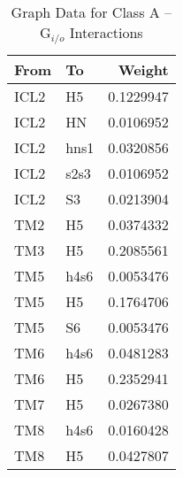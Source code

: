 \begin{table}[!h]

\caption{\label{tab:unnamed-chunk-2}Graph Data for Class A – G$_{i/o}$ Interactions}
\centering
\begin{tabular}{llr}
\toprule
From & To & Weight\\
\midrule
ICL2 & H5 & 0.1229947\\
ICL2 & HN & 0.0106952\\
ICL2 & hns1 & 0.0320856\\
ICL2 & s2s3 & 0.0106952\\
ICL2 & S3 & 0.0213904\\
\addlinespace
TM2 & H5 & 0.0374332\\
TM3 & H5 & 0.2085561\\
TM5 & h4s6 & 0.0053476\\
TM5 & H5 & 0.1764706\\
TM5 & S6 & 0.0053476\\
\addlinespace
TM6 & h4s6 & 0.0481283\\
TM6 & H5 & 0.2352941\\
TM7 & H5 & 0.0267380\\
TM8 & h4s6 & 0.0160428\\
TM8 & H5 & 0.0427807\\
\bottomrule
\end{tabular}
\end{table}
